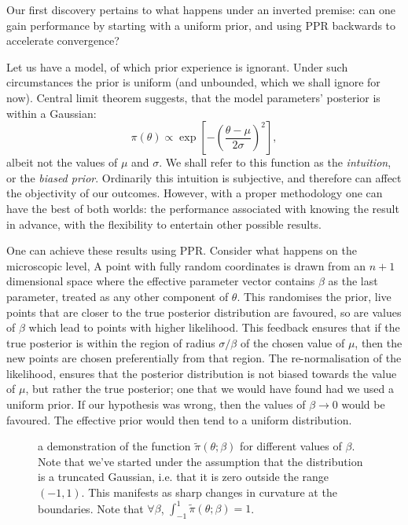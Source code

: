 \documentclass[usenatbib]{mnras}
\begin{document}
Our first discovery pertains to what happens under an inverted
premise: can one gain performance by starting with a uniform prior,
and using PPR backwards to accelerate convergence?

Let us have a model, of which prior experience is ignorant. Under
such circumstances the prior is uniform (and unbounded, which we
shall ignore for now). Central limit theorem suggests, that the
model parameters' posterior is within a Gaussian:
\begin{equation}
 \pi (\theta) \propto \exp \left[-\left(\frac{\theta - \mu}{2\sigma}\right)^{2} \right],
\end{equation}
albeit not the values of \(\mu\) and \(\sigma\). We shall refer to
this function as the \emph{intuition}, or the \emph{biased prior}. Ordinarily
this intuition is subjective, and therefore can affect the
objectivity of our outcomes. However, with a proper methodology one
can have the best of both worlds: the performance associated with
knowing the result in advance, with the flexibility to entertain
other possible results.

One can achieve these results using PPR. Consider what happens on
the microscopic level, A point with fully random coordinates is
drawn from an \(n+1\) dimensional space where the effective
parameter vector contains \(\beta\) as the last parameter, treated
as any other component of \(\theta\). This randomises the prior, live
points that are closer to the true posterior distribution are
favoured, so are values of \(\beta\) which lead to points with
higher likelihood.  This feedback ensures that if the true
posterior is within the region of radius \(\sigma / \beta\) of the
chosen value of \(\mu\), then the new points are chosen
preferentially from that region. The re-normalisation of the
likelihood, ensures that the posterior distribution is not biased
towards the value of \(\mu\), but rather the true posterior; one
that we would have found had we used a uniform prior. If our
hypothesis was wrong, then the values of \(\beta \rightarrow 0\)
would be favoured. The effective prior would then tend to a uniform
distribution.

\begin{figure}
 
\caption{\label{org2d013cb}
a demonstration of the function \(\tilde{\pi}(\theta; \beta)\) for different values of \(\beta\). Note that we've started under the assumption that the distribution is a truncated Gaussian, i.e. that it is zero outside the range \((-1, 1)\). This manifests as sharp changes in curvature at the boundaries. Note that \(\forall \beta\), \(\int_{-1}^{1}\tilde{\pi}(\theta; \beta) = 1\).}
\end{figure}
\end{document}
